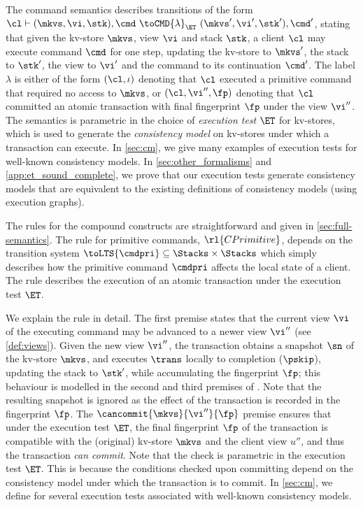 %
The command semantics describes transitions of the form
$\cl \vdash (\mkvs, \vi, \stk), \cmd \ \toCMD{\lambda}_{\ET} \ (\mkvs', \vi', \stk') ,
\cmd'$, stating that given the kv-store $\mkvs$, view $\vi$ and stack $\stk$, 
a client $\cl$ may execute command $\cmd$ for one step, updating 
the kv-store to $\mkvs'$, the stack to $\stk'$, the view to \( \vi' \) and the command to its continuation $\cmd'$.
The label $\lambda$ is either of the form $(\cl, \iota)$ denoting that $\cl$ executed a primitive command
that required no access to $\mkvs$, 
or $(\cl, \vi'', \fp)$ denoting that $\cl$ committed an atomic transaction with final fingerprint $\fp$ under the view $\vi''$.
The semantics is parametric in the choice of \emph{execution test}
$\ET$ for kv-stores, which is used to generate 
the \emph{consistency model} on kv-stores
under which a 
transaction can execute.
In \cref{sec:cm}, we give many examples of execution tests for
well-known consistency models.
In \cref{sec:other_formalisms} and \cref{app:et_sound_complete}, we prove that our execution tests 
generate consistency models that are equivalent to the existing definitions of
consistency models (using execution graphs). 

The rules for the compound constructs are straightforward and given in \cref{sec:full-semantics}.
The rule for primitive commands, $\rl{CPrimitive}$, 
depends on the 
transition system $\toLTS{\cmdpri} \subseteq \Stacks \times \Stacks$ 
which simply describes how the primitive command $\cmdpri$ affects the local state of a client.
The rule   describes the execution of an atomic 
transaction under the execution test $\ET$. 


We explain the  rule in detail. 
The first premise 
states that the current view $\vi$ of the executing command may be advanced to a newer  view $\vi''$ (see \cref{def:views}). 
Given the new view $\vi''$, the transaction obtains a snapshot $\sn$ of the kv-store $\mkvs$, 
and executes $\trans$ locally to completion ($\pskip$), updating the stack to $\stk'$, while accumulating the fingerprint $\fp$; 
this behaviour  is modelled in the second and third premises of .
Note that the resulting snapshot is ignored 
as the effect of the transaction is recorded in the fingerprint $\fp$. 
The $\cancommit{\mkvs}{\vi''}{\fp}$ premise ensures that under the execution test $\ET$, 
the final fingerprint $\fp$ of the transaction is compatible with the (original) kv-store
$\mkvs$ and the client view $u''$, and thus the transaction \emph{can commit}. 
Note that the \cancommitname check is parametric in the execution test $\ET$.
This is because the conditions checked upon committing depend on the consistency model under which the transaction is to commit. 
In \cref{sec:cm}, we define \cancommitname for several execution tests associated with well-known consistency models.


